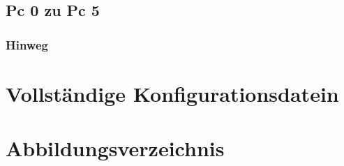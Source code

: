 \documentclass[a4paper]{article}
\begin{document}
\subsection{Pc 0 zu Pc 5}

\subsubsection{Hinweg}




\newpage

\section{Vollständige Konfigurationsdatein}

\newpage

\section{Abbildungsverzeichnis}

\listoffigures
\end{document}
